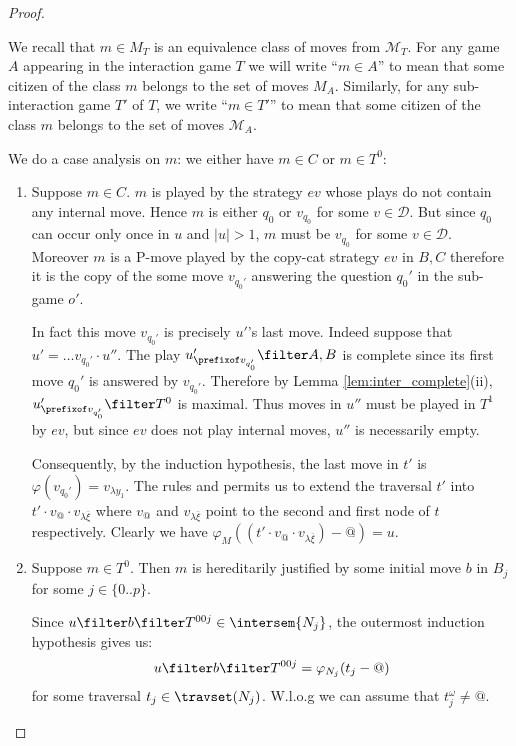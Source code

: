 \begin{proof}
\begin{enumerate}[$\bullet$]
\begin{enumerate}
We recall that $m \in M_T$ is an equivalence class of moves from $\mathcal{M}_T$. For any game $A$ appearing in the interaction game $T$ we will write ``$m \in A$'' to mean that some citizen of the class $m$ belongs to the set of moves $M_A$. Similarly, for any sub-interaction game $T'$ of $T$, we write ``$m \in T'$'' to mean that some citizen of the class $m$ belongs to the set of moves $\mathcal{M}_A$.

We do a case analysis on $m$: we either have $m\in C$ or $m\in T^0$:
    \begin{enumerate}[-]
    \item Suppose $m \in C$. $m$ is played by the strategy $ev$ whose plays do not contain any internal move. Hence $m$ is either $q_0$ or $v_{q_0}$ for some
    $v\in\mathcal{D}$. But since $q_0$ can occur only once in
    $u$ and $|u|>1$, $m$ must be $v_{q_0}$ for some
    $v\in \mathcal{D}$.  Moreover $m$ is a P-move played by the
    copy-cat strategy $ev$ in $B,C$ therefore it is the copy
    of the some move $v_{q_0'}$ answering the question $q_0'$ in the sub-game $o'$.

    In fact this move $v_{q_0'}$ is precisely $u'$'s last move. Indeed
    suppose that $u' = \ldots v_{q_0'} \cdot u''$. The play
    $u'_{\prefixof v_{q_0'}}\filter A,B$ is complete since its
    first move $q_0'$ is answered by $v_{q_0'}$. Therefore by
    Lemma \ref{lem:inter_complete}(ii), $u'_{\prefixof
    v_{q_0'}}\filter T^0$ is maximal. Thus moves in $u''$ must
    be played in $T^1$ by $ev$, but since $ev$ does not play internal
    moves, $u''$ is necessarily empty.

    Consequently, by the induction hypothesis, the last move in $t'$ is $\varphi(v_{q_0'}) = v_{\lambda y_1}$.
    The rules  and  permits us to extend
    the traversal $t'$ into $t' \cdot v_@ \cdot v_{\lambda \overline{\xi}}$ where $v_@$ and $v_{\lambda
    \overline{\xi}}$ point to the second and first node of $t$ respectively. Clearly we have $\varphi_M((t'\cdot v_@ \cdot v_{\lambda \overline{\xi}})-@) = u$.

    \item Suppose $m\in T^0$. Then $m$ is hereditarily justified by some initial move $b$ in $B_j$ for some $j\in \{0..p\}$.

        Since $u \filter b \filter T^{00j} \in \intersem{N_j}$, the outermost induction hypothesis gives us:
        \begin{equation}
        u \filter b \filter T^{00j} = \varphi_{N_j}(t_j-@)  \label{eqn:corresp_outmost_ih}
        \end{equation}
          for some traversal $t_j \in \travset(N_j)$. W.l.o.g we can assume that $t_j^\omega \neq @$.
          

\end{enumerate}
\end{enumerate}
\end{enumerate}
\end{proof}

